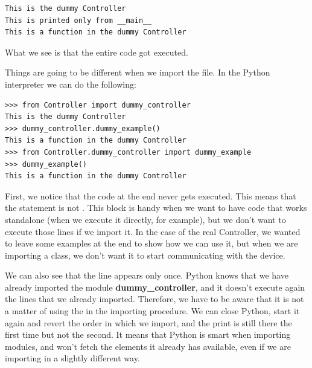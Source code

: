 \begin{verbatim}
This is the dummy Controller
This is printed only from __main__
This is a function in the dummy Controller
\end{verbatim}

What we see is that the entire code got executed.


Things are going to be different when we import the file. In the Python interpreter we can do the following:

\begin{verbatim}
>>> from Controller import dummy_controller
This is the dummy Controller
>>> dummy_controller.dummy_example()
This is a function in the dummy Controller
>>> from Controller.dummy_controller import dummy_example
>>> dummy_example()
This is a function in the dummy Controller
\end{verbatim}

First, we notice that the code at the end never gets executed. This means that the  statement is not . This block is handy when we want to have code that works standalone (when we execute it directly, for example), but we don't want to execute those lines if we import it. In the case of the real Controller, we wanted to leave some examples at the end to show how we can use it, but when we are importing a class, we don't want it to start communicating with the device.

\sloppy We can also see that the line  appears only once. Python knows that we have already imported the module \textbf{dummy\_controller}, and it doesn't execute again the lines that we already imported. Therefore, we have to be aware that it is not a matter of using the  in the importing procedure. We can close Python, start it again and revert the order in which we import, and the print is still there the first time but not the second. It means that Python is smart when importing modules, and won't fetch the elements it already has available, even if we are importing in a slightly different way.



